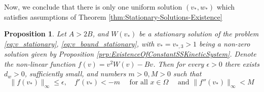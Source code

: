 \documentclass[11pt, a4paper]{article}
\theoremstyle{break}
\theoremstyle{break}
\newtheorem{prp}{Proposition}[section]
\theoremstyle{break}
\theoremstyle{break}
\theoremstyle{break}
\theoremstyle{break}
\theoremstyle{break}
\theoremstyle{break}
\theoremstyle{break}
\begin{document}
Now, we conclude that there is only one uniform solution $(v_*, w_*)$ which satisfies assumptions of Theorem \ref{thm:Stationary-Solutions-Existence}

\begin{prp}
    \label{prp:nonlinearity_f_properties_at_v_star}
    Let $A > 2B$, and $W(v_*)$ be a stationary solution of the problem \eqref{eq:v_stationary}, \eqref{eq:v_bound_stationary}, with $v_* = v_{*, 3} > 1$ being a non-zero solution given by Proposition \ref{prp:ExistenceOfConstantSSKineticSystem}. Denote the non-linear function $f(v) = v^2W(v) - Bv$. Then for every $\epsilon > 0$ there exists $d_w > 0$, sufficiently small, and numbers $m > 0, M >0$ such that
    \begin{equation}
        \label{eq:nonlinearity_f_condition_existence}
        \|f(v_*)\|_\infty \leq \epsilon, 
        \quad
        f'(v_*) < -m
        \quad
        \text{ for all }
        x \in \Omega
        \quad
        \text{ and }
        \|f''(v_*)\|_\infty < M
    \end{equation}
\end{prp}
\end{document}
